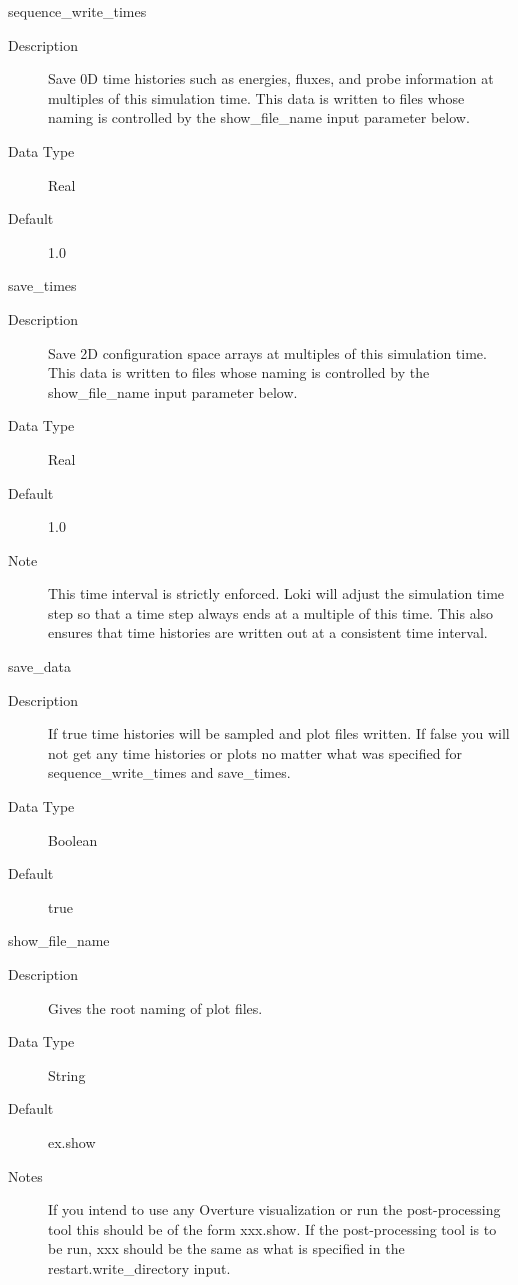 \documentclass[11pt]{amsart}
\begin{document}
sequence\_write\_times
\begin{description}
\item [Description] Save 0D time histories such as energies, fluxes, and probe
information at multiples of this simulation time.  This data is written to
files whose naming is controlled by the show\_file\_name input parameter below.
\item [Data Type] Real
\item [Default] 1.0
\end{description}

save\_times
\begin{description}
\item [Description] Save 2D configuration space arrays at multiples of this
simulation time.  This data is written to files whose naming is controlled by
the show\_file\_name input parameter below.
\item [Data Type] Real
\item [Default] 1.0
\item [Note] This time interval is strictly enforced.  Loki will adjust the
simulation time step so that a time step always ends at a multiple of this
time.  This also ensures that time histories are written out at a consistent
time interval.
\end{description}

save\_data
\begin{description}
\item [Description] If true time histories will be sampled and plot files
written.  If false you will not get any time histories or plots no matter
what was specified for sequence\_write\_times and save\_times.
\item [Data Type] Boolean
\item [Default] true
\end{description}

show\_file\_name
\begin{description}
\item [Description] Gives the root naming of plot files.
\item [Data Type] String
\item [Default] ex.show
\item [Notes] If you intend to use any Overture visualization or run the
post-processing tool this should be of the form xxx.show.  If the
post-processing tool is to be run, xxx should be the same as what is specified
in the restart.write\_directory input.
\end{description}
\end{document}
